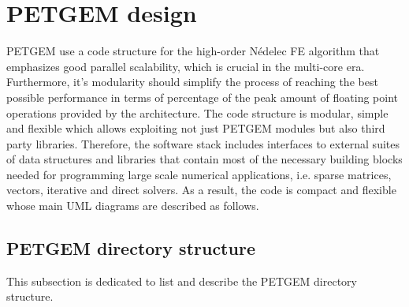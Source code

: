 \documentclass[letterpaper,10pt,english]{sphinxmanual}
\begin{document}
\section{PETGEM design}
\label{\detokenize{Manual:petgem-design}}\label{\detokenize{Manual:id4}}
PETGEM use a code structure for the high-order Nédelec FE algorithm that emphasizes
good parallel scalability, which is crucial in the multi-core era.
Furthermore, it’s modularity should simplify the process of reaching the
best possible performance in terms of percentage of the peak amount of
floating point operations provided by the architecture. The code structure is
modular, simple and flexible which allows exploiting not just PETGEM modules
but also third party libraries. Therefore, the software stack includes
interfaces to external suites of data structures and libraries that contain
most of the necessary building blocks needed for programming large scale
numerical applications, i.e. sparse matrices, vectors, iterative and direct
solvers. As a result, the code is compact and
flexible whose main UML diagrams are described as follows.


\subsection{PETGEM directory structure}
\label{\detokenize{Manual:petgem-directory-structure}}
This subsection is dedicated to list and describe the PETGEM directory
structure.
\end{document}
